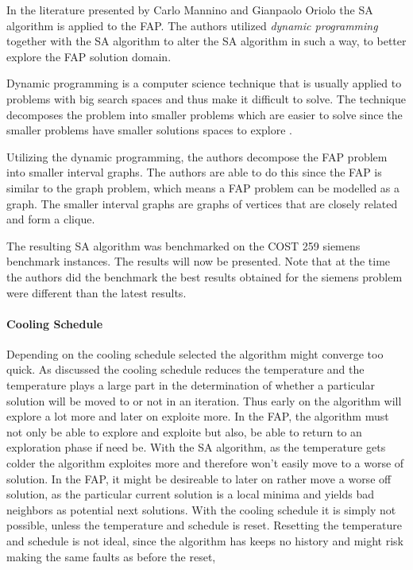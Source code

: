 In the literature presented by Carlo Mannino and Gianpaolo Oriolo\cite{SolvingSuperIntervalGraphs} the SA algorithm is applied to the FAP. The authors utilized \emph{dynamic programming} together with the SA algorithm to alter the SA algorithm in such a way, to better explore the FAP solution domain.

Dynamic programming is a computer science technique that is usually applied to problems with big search spaces and thus make it difficult to solve\cite{AIModernApproach}. The technique decomposes the problem into smaller problems which are easier to solve since the smaller problems have smaller solutions spaces to explore \cite{AIModernApproach,IntroMathProgramming}.

Utilizing the dynamic programming, the authors decompose the FAP problem into smaller interval graphs. The authors are able to do this since the FAP is similar to the graph problem, which means a FAP problem can be modelled as a graph\cite{ProblemDecompMIFAP}. The smaller interval graphs are graphs of vertices that are closely related and form a clique\cite{ProblemDecompMIFAP}.

The resulting SA algorithm was benchmarked on the COST 259 siemens benchmark instances. The results will now be presented. Note that at the time the authors did the benchmark the best results obtained for the siemens problem were different than the latest results.
\paragraph{Cooling Schedule}
Depending on the cooling schedule selected the algorithm might converge too quick. As discussed the cooling schedule reduces the temperature and the temperature plays a large part in the determination of whether a particular solution will be moved to or not in an iteration. Thus early on the algorithm will explore a lot more and later on exploite more. In the FAP, the algorithm must not only be able to explore and exploite but also, be able to return to an exploration phase if need be.
With the SA algorithm, as the temperature gets colder the algorithm exploites more and therefore won't easily move to a worse of solution. In the FAP, it might be desireable to later on rather move a worse off solution, as the particular current solution is a local minima and yields bad neighbors as potential next solutions. With the cooling schedule it is simply not possible, unless the temperature and schedule is reset. Resetting the temperature and schedule is not ideal, since the algorithm has keeps no history and might risk making the same faults as before the reset,
